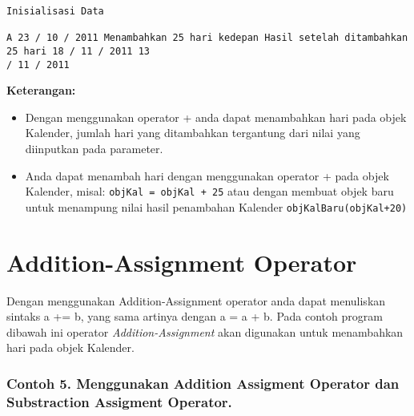\begin{verbatim}
Inisialisasi Data

A 23 / 10 / 2011 Menambahkan 25 hari kedepan Hasil setelah ditambahkan 25 hari 18 / 11 / 2011 13
/ 11 / 2011
\end{verbatim}

\textbf{Keterangan:}

\begin{itemize}
\tightlist
\item
  Dengan menggunakan operator + anda dapat menambahkan hari pada objek
  Kalender, jumlah hari yang ditambahkan tergantung dari nilai yang
  diinputkan pada parameter.
\item
  Anda dapat menambah hari dengan menggunakan operator + pada objek
  Kalender, misal: \texttt{objKal\ =\ objKal\ +\ 25} atau dengan membuat
  objek baru untuk menampung nilai hasil penambahan Kalender
  \texttt{objKalBaru(objKal+20)}
\end{itemize}

\section{Addition-Assignment
Operator}\label{addition-assignment-operator}

Dengan menggunakan Addition-Assignment operator anda dapat menuliskan
sintaks a += b, yang sama artinya dengan a = a + b. Pada contoh program
dibawah ini operator \emph{Addition-Assignment} akan digunakan untuk
menambahkan hari pada objek Kalender.

\subsubsection*{Contoh 5. Menggunakan Addition Assigment Operator dan Substraction
Assigment Operator.}

